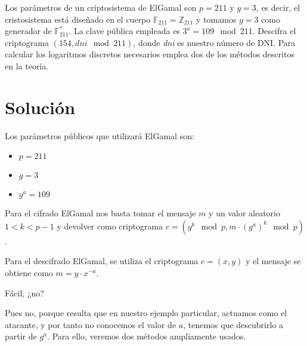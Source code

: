 	Los parámetros  de un criptosistema de ElGamal son $p = 211$ y $g = 3$, es decir, el cristosistema está
	diseñado en el cuerpo $\mathbb{F}_{211} = \mathbb{Z}_{211}$ y tomamos $g = 3$ como generador de
	$\mathbb{F}^*_{211}$. La clave pública empleada es $3^a = 109  \mod 211$. Descifra el criptograma
	$(154, \textit{dni} \mod 211)$, donde \textit{dni} es nuestro número de DNI. Para calcular los logaritmos
	discretos necesarios emplea dos de los métodos descritos en la teoría.
\section*{Solución}
	Los parámetros públicos que utilizará ElGamal son:
	\begin{itemize}
		\item $p = 211$
		\item $g = 3$
		\item $g^a = 109$
	\end{itemize}
	
	Para el cifrado ElGamal nos basta tomar el mensaje $m$ y un valor aleatorio $1 < k < p-1$ y devolver como
	criptograma $c = \left(g^k \mod p, m \cdot \left(g^a\right)^k \mod p\right)$.
	
	Para el descifrado ElGamal, se utiliza el criptograma $c = \left(x, y\right)$ y el mensaje se obtiene como
	$m = y \cdot x^{-a}$.
	
	Fácil, ¿no?
	
	Pues no, porque resulta que en nuestro ejemplo particular, actuamos como el atacante, y por tanto no conocemos
	el valor de $a$, tenemos que descubrirlo a partir de $g^a$. Para ello, veremos dos métodos ampliamente usados.
	
